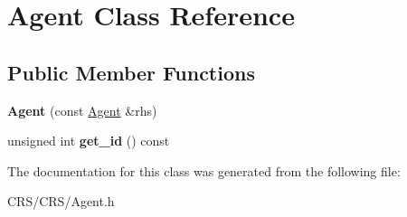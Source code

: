 \hypertarget{class_agent}{}\section{Agent Class Reference}
\label{class_agent}
\subsection*{Public Member Functions}
\begin{DoxyCompactItemize}
\item 
\mbox{\label{class_agent_ac2caeb6d392852474524ebff0aefef15}} 
{\bfseries Agent} (const \hyperlink{class_agent}{Agent} \&rhs)
\item 
\mbox{\label{class_agent_a72952569a88ce19d7ef569b832932dda}} 
unsigned int {\bfseries get\+\_\+id} () const
\end{DoxyCompactItemize}


The documentation for this class was generated from the following file\+:\begin{DoxyCompactItemize}
\item 
C\+R\+S/\+C\+R\+S/Agent.\+h\end{DoxyCompactItemize}
